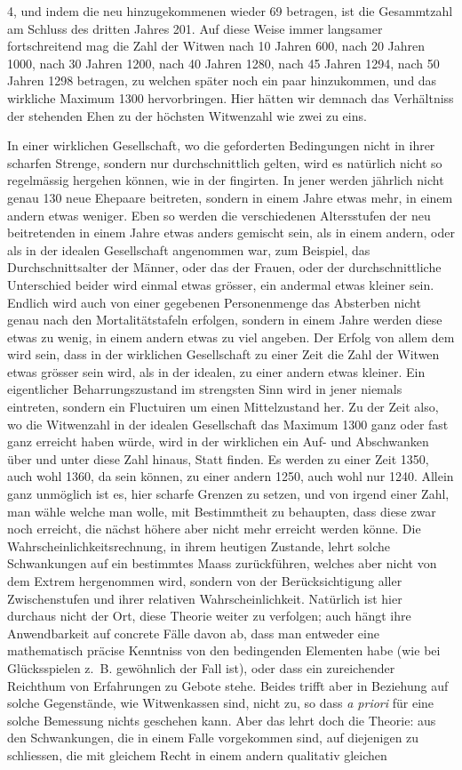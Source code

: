 \documentclass[12pt,a4paper]{article}
\begin{document}
4, und indem die neu hinzugekommenen wieder 69 betragen, ist die Gesammtzahl am Schluss des dritten Jahres 201. Auf diese Weise immer langsamer fortschreitend mag die Zahl der Witwen nach 10 Jahren 600, nach 20 Jahren 1000, nach 30 Jahren 1200, nach 40 Jahren 1280, nach 45 Jahren 1294, nach 50 Jahren 1298 betragen, zu welchen später noch ein paar hinzukommen, und das wirkliche Maximum 1300 hervorbringen. Hier hätten wir demnach das Verhältniss der stehenden Ehen zu der höchsten Witwenzahl wie zwei zu eins.

In einer wirklichen Gesellschaft, wo die geforderten Bedingungen nicht in ihrer scharfen Strenge, sondern nur durchschnittlich gelten, wird es natürlich nicht so regelmässig hergehen können, wie in der fingirten. In jener werden jährlich nicht genau 130 neue Ehepaare beitreten, sondern in einem Jahre etwas mehr, in einem andern etwas weniger. Eben so werden die verschiedenen Altersstufen der neu beitretenden in einem Jahre etwas anders gemischt sein, als in einem andern, oder als in der idealen Gesellschaft angenommen war, zum Beispiel, das Durchschnittsalter der Männer, oder das der Frauen, oder der durchschnittliche Unterschied beider wird einmal etwas grösser, ein andermal etwas kleiner sein. Endlich wird auch von einer gegebenen Personenmenge das Absterben nicht genau nach den Mortalitätstafeln erfolgen, sondern in einem Jahre werden diese etwas zu wenig, in einem andern etwas zu viel angeben. Der Erfolg von allem dem wird sein, dass in der wirklichen Gesellschaft zu einer Zeit die Zahl der Witwen etwas grösser sein wird, als in der idealen, zu einer andern etwas kleiner. Ein eigentlicher Beharrungszustand im strengsten Sinn wird in jener niemals eintreten, sondern ein Fluctuiren um einen Mittelzustand her. Zu der Zeit also, wo die Witwenzahl in der idealen Gesellschaft das Maximum 1300 ganz oder fast ganz erreicht haben würde, wird in der wirklichen ein Auf- und Abschwanken über und unter diese Zahl hinaus, Statt finden. Es werden zu einer Zeit 1350, auch wohl 1360, da sein können, zu einer andern 1250, auch wohl nur 1240. Allein ganz unmöglich ist es, hier scharfe Grenzen zu setzen, und von irgend einer Zahl, man wähle welche man wolle, mit Bestimmtheit zu behaupten, dass diese zwar noch erreicht, die nächst höhere aber nicht mehr erreicht werden könne. Die Wahrscheinlichkeitsrechnung, in ihrem heutigen Zustande, lehrt solche Schwankungen auf ein bestimmtes Maass zurückführen, welches aber nicht von dem Extrem hergenommen wird, sondern von der Berücksichtigung aller Zwischenstufen und ihrer relativen Wahrscheinlichkeit. Natürlich ist hier durchaus nicht der Ort, diese Theorie weiter zu verfolgen; auch hängt ihre Anwendbarkeit auf concrete Fälle davon ab, dass man entweder eine mathematisch präcise Kenntniss von den bedingenden Elementen habe (wie bei Glücksspielen z.~B. gewöhnlich der Fall ist), oder dass ein zureichender Reichthum von Erfahrungen zu Gebote stehe. Beides trifft aber in Beziehung auf solche Gegenstände, wie Witwenkassen sind, nicht zu, so dass \textit{a priori} für eine solche Bemessung nichts geschehen kann. Aber das lehrt doch die Theorie: aus den Schwankungen, die in einem Falle vorgekommen sind, auf diejenigen zu schliessen, die mit gleichem Recht in einem andern qualitativ gleichen 
\end{document}
